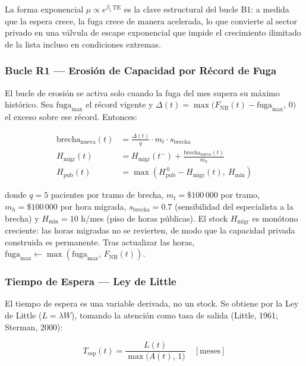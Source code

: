 \documentclass[12pt,a4paper]{article}
\begin{document}
La forma exponencial $\mu \propto e^{\beta_1\,\text{TE}}$ es la clave estructural del bucle B1: a medida que la espera crece, la fuga crece de manera acelerada, lo que convierte al sector privado en una válvula de escape exponencial que impide el crecimiento ilimitado de la lista incluso en condiciones extremas.

\subsubsection*{Bucle R1 — Erosión de Capacidad por Récord de Fuga}

El bucle de erosión se activa solo cuando la fuga del mes supera su máximo histórico. Sea $\text{fuga}_{\max}$ el récord vigente y $\Delta(t) = \max\bigl(F_{\text{NB}}(t) - \text{fuga}_{\max},\,0\bigr)$ el exceso sobre ese récord. Entonces:

\begin{align}
\text{brecha}_{\text{nueva}}(t)
  &= \frac{\Delta(t)}{q}\cdot m_t \cdot s_{\text{brecha}} \label{eq:brecha}\\[4pt]
H_{\text{migr}}(t)
  &= H_{\text{migr}}(t^-) + \frac{\text{brecha}_{\text{nueva}}(t)}{m_h} \label{eq:hmigr}\\[4pt]
H_{\text{pub}}(t)
  &= \max\!\left( H_{\text{pub}}^{\,0} - H_{\text{migr}}(t),\ H_{\min} \right) \label{eq:hpub}
\end{align}

donde $q = 5$ pacientes por tramo de brecha, $m_t = \$100\,000$ por tramo, $m_h = \$100\,000$ por hora migrada, $s_{\text{brecha}} = 0.7$ (sensibilidad del especialista a la brecha) y $H_{\min} = 10$ h/mes (piso de horas públicas). El stock $H_{\text{migr}}$ es monótono creciente: las horas migradas no se revierten, de modo que la capacidad privada construida es permanente. Tras actualizar las horas, $\text{fuga}_{\max} \leftarrow \max(\text{fuga}_{\max},\,F_{\text{NB}}(t))$.

\subsubsection*{Tiempo de Espera — Ley de Little}

El tiempo de espera es una variable derivada, no un stock. Se obtiene por la Ley de Little ($L = \lambda W$), tomando la atención como tasa de salida (Little, 1961; Sterman, 2000):

\begin{equation}
T_{\text{esp}}(t) = \frac{L(t)}{\max\!\bigl(A(t),\,1\bigr)} \quad [\text{meses}]
\label{eq:little}
\end{equation}
\end{document}
